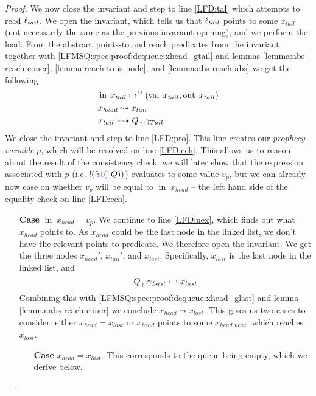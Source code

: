\documentclass[a4paper, 11pt]{report}
\newcommand{\nIn}[1]{\operatorname{in} \; #1}
\newcommand{\nVal}[1]{\operatorname{val} \; #1}
\newcommand{\nOut}[1]{\operatorname{out} \; #1}
\newcommand{\Qg}{Q_\gname}
\newcommand{\isNode}[1]{\nIn{#1} \mapsto^{\persistently} (\nVal{#1}, \nOut{#1})}
\newcommand{\reach}[2]{#1 \leadsto #2}
\newcommand{\ar}[2]{#1 \dashrightarrow #2}
\newcommand{\ap}[2]{#1 \rightarrowtail #2}
\begin{document}
\begin{proof}
  We now close the invariant and step to line \ref{LFD:tal} which attempts to read $\ell_{tail}$. We open the invariant, which tells us that $\ell_{tail}$ points to some $x_{tail}$ (not necessarily the same as the previous invariant opening), and we perform the load. From the abstract points-to and reach predicates from the invariant together with \ref{LFMSQ:spec:proof:dequeue:xhead_gtail} and lemmas \ref{lemma:abs-reach-concr}, \ref{lemma:reach-to-is-node}, and \ref{lemma:abs-reach-abs} we get the following
  \begin{align}
    &\isNode{x_{tail}}\label{LFMSQ:spec:proof:dequeue:xtail_node}\\
    &\reach{x_{head}}{x_{tail}}\label{LFMSQ:spec:proof:dequeue:xhead_r_xtail}\\
    &\ar{x_{tail}}{\Qg.\gname_{Tail}}\label{LFMSQ:spec:proof:dequeue:xtail_gtail}\\
  \end{align}
  We close the invariant and step to line \ref{LFD:pro}. This line creates our \textit{prophecy variable} $p$, which will be resolved on line \ref{LFD:cch}. This allows us to reason about the result of the consistency check: we will later show that the expression associated with $p$ (i.e. $\mathop{!}(\operatorname{\textsf{\color{blue} fst}} (\mathop{!} Q))$) evaluates to some value $v_p$, but we can already now case on whether $v_p$ will be equal to $\nIn{x_{head}}$ -- the left hand side of the equality check on line \ref{LFD:cch}.
  \begin{itemize}
    \item[\textbf{Case}] $\nIn{x_{head}} = v_p$.
    We continue to line \ref{LFD:nex}, which finds out what $x_{head}$ points to. As $x_{head}$ could be the last node in the linked list, we don't have the relevant points-to predicate. We therefore open the invariant. We get the three nodes $x_{head}'$, $x_{tail}'$, and $x_{last}$. Specifically, $x_{last}$ is the last node in the linked list, and 
    \begin{equation}\label{LFMSQ:spec:proof:dequeue:glast_xlast}
      \ap{\Qg.\gname_{Last}}{x_{last}}
    \end{equation}
    Combining this with \ref{LFMSQ:spec:proof:dequeue:xhead_glast} and lemma \ref{lemma:abs-reach-concr} we conclude $\reach{x_{head}}{x_{last}}$. This gives us two cases to consider: either $x_{head} = x_{last}$ or $x_{head}$ points to some $x_{head\_next}$, which reaches $x_{last}$.
    \begin{itemize}
      \item[\textbf{Case}] $x_{head} = x_{last}$. This corresponds to the queue being empty, which we derive below.\\

\end{itemize}
\end{itemize}
\end{proof}
\end{document}
